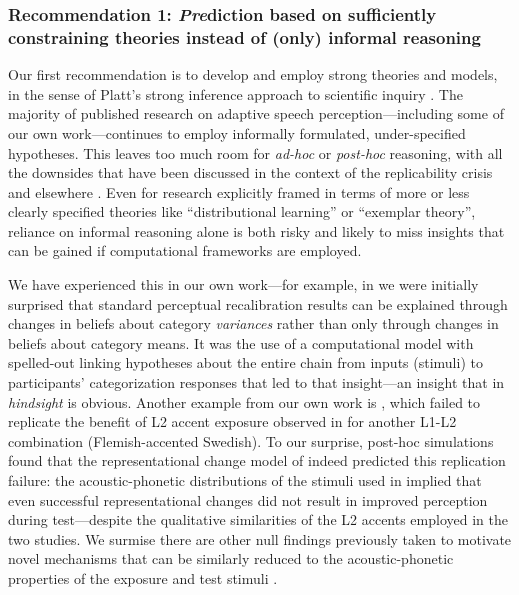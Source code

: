 \documentclass[
  11pt,
  man,floatsintext]{apa6}
\begin{document}
\hypertarget{recommendation-1-prediction-based-on-sufficiently-constraining-theories-instead-of-only-informal-reasoning}{%
\subsubsection{\texorpdfstring{Recommendation 1: \emph{Pre}diction based on sufficiently constraining theories instead of (only) informal reasoning}{Recommendation 1: Prediction based on sufficiently constraining theories instead of (only) informal reasoning}}\label{recommendation-1-prediction-based-on-sufficiently-constraining-theories-instead-of-only-informal-reasoning}}

Our first recommendation is to develop and employ strong theories and models, in the sense of Platt's strong inference approach to scientific inquiry \autocite{platt1964}. The majority of published research on adaptive speech perception---including some of our own work---continues to employ informally formulated, under-specified hypotheses. This leaves too much room for \emph{ad-hoc} or \emph{post-hoc} reasoning, with all the downsides that have been discussed in the context of the replicability crisis and elsewhere \autocites[e.g.,][]{guest-martin2021,starns2019,vasishth2021,yarkoni2022}. Even for research explicitly framed in terms of more or less clearly specified theories like ``distributional learning'' or ``exemplar theory'', reliance on informal reasoning alone is both risky and likely to miss insights that can be gained if computational frameworks are employed.

We have experienced this in our own work---for example, in \textcite{kleinschmidt-jaeger2015} we were initially surprised that standard perceptual recalibration results can be explained through changes in beliefs about category \emph{variances} rather than only through changes in beliefs about category means. It was the use of a computational model with spelled-out linking hypotheses about the entire chain from inputs (stimuli) to participants' categorization responses that led to that insight---an insight that in \emph{hindsight} is obvious. Another example from our own work is \textcite{tan2021}, which failed to replicate the benefit of L2 accent exposure observed in \textcite{xie2016jep} for another L1-L2 combination (Flemish-accented Swedish). To our surprise, post-hoc simulations found that the representational change model of \textcite{kleinschmidt-jaeger2015} indeed predicted this replication failure: the acoustic-phonetic distributions of the stimuli used in \textcite{tan2021} implied that even successful representational changes did not result in improved perception during test---despite the qualitative similarities of the L2 accents employed in the two studies. We surmise there are other null findings previously taken to motivate novel mechanisms that can be similarly reduced to the acoustic-phonetic properties of the exposure and test stimuli \autocites[see e.g.,][]{floccia2006,zheng-samuel2020}.
\end{document}
